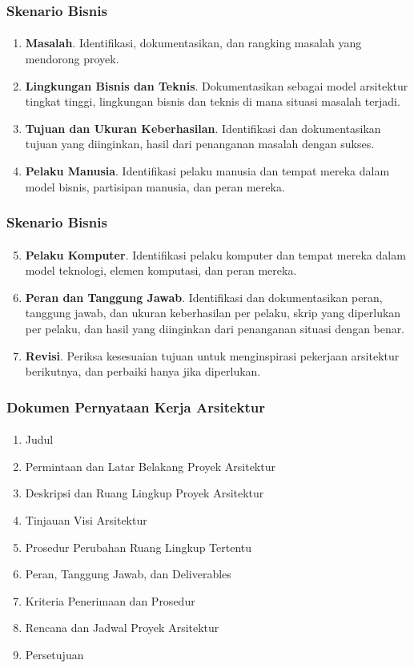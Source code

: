 \documentclass[aspectratio=169, table]{beamer}
\begin{document}
	\begin{frame}
		\frametitle{Skenario Bisnis}
		\framesubtitle{\hspace{1cm}}
		\begin{enumerate}
			\item \textbf{Masalah}.
			Identifikasi, dokumentasikan, dan rangking masalah yang mendorong proyek.
			\item \textbf{Lingkungan Bisnis dan Teknis}.
			Dokumentasikan sebagai model arsitektur tingkat tinggi, lingkungan bisnis dan teknis di mana situasi masalah terjadi.
			\item \textbf{Tujuan dan Ukuran Keberhasilan}.
			Identifikasi dan dokumentasikan tujuan yang diinginkan, hasil dari penanganan masalah dengan sukses.
			\item \textbf{Pelaku Manusia}.
			Identifikasi pelaku manusia dan tempat mereka dalam model bisnis, partisipan manusia, dan peran mereka.

		\end{enumerate}
	\end{frame}

	\begin{frame}
		\frametitle{Skenario Bisnis}
		\framesubtitle{\hspace{1cm}}
		\begin{enumerate}
			\setcounter{enumi}{4}
			\item \textbf{Pelaku Komputer}.
			Identifikasi pelaku komputer dan tempat mereka dalam model teknologi, elemen komputasi, dan peran mereka.
			\item \textbf{Peran dan Tanggung Jawab}.
			Identifikasi dan dokumentasikan peran, tanggung jawab, dan ukuran keberhasilan per pelaku, skrip yang diperlukan per pelaku, dan hasil yang diinginkan dari penanganan situasi dengan benar.
			\item \textbf{Revisi}.
			Periksa kesesuaian tujuan untuk menginspirasi pekerjaan arsitektur berikutnya, dan perbaiki hanya jika diperlukan.
		\end{enumerate}
	\end{frame}

	\begin{frame}
		\frametitle{Dokumen Pernyataan Kerja Arsitektur}
		\framesubtitle{\hspace{1cm}}
        \vspace{20pt}
		\begin{enumerate}
			\item Judul
			\item Permintaan dan Latar Belakang Proyek Arsitektur
			\item Deskripsi dan Ruang Lingkup Proyek Arsitektur
			\item Tinjauan Visi Arsitektur
			\item Prosedur Perubahan Ruang Lingkup Tertentu
			\item Peran, Tanggung Jawab, dan Deliverables
			\item Kriteria Penerimaan dan Prosedur
			\item Rencana dan Jadwal Proyek Arsitektur
			\item Persetujuan
		\end{enumerate}
	\end{frame}
\end{document}
